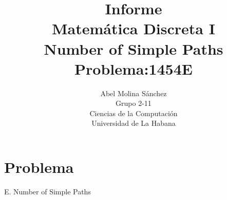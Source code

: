 \documentclass[12pt]{article}
\begin{document}
  \title{Informe\\
  Matem\'atica Discreta I\\
      Number of Simple Paths\\
     Problema:1454E}
  \author{Abel Molina S\'anchez\\
  Grupo 2-11\\
  Ciencias de la Computaci\'on\\
  Universidad de La Habana}
    \maketitle  

\newpage

\section{Problema}

\begin{center}
E. Number of Simple Paths
\end{center}
\end{document}
